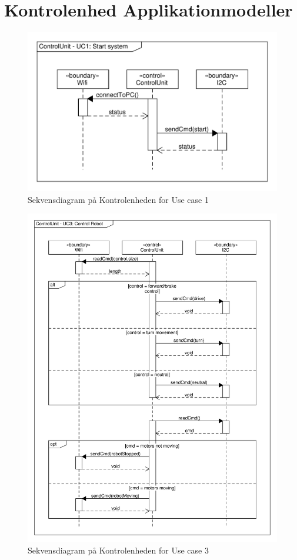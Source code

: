 \newpage
\section{Kontrolenhed Applikationmodeller}
\begin{figure} [H]
	\centering
	\includegraphics[clip, trim = 0cm 0cm 0cm 0.5cm ,width = \textwidth]{Figur/seq_Robot_UC1.pdf}
	\caption{Sekvensdiagram på Kontrolenheden for Use case 1}
	\label{fig:seq_Robot_UC1}
\end{figure}
\begin{figure} [H]
	\centering
	\includegraphics[clip, trim = 0cm 0cm 0cm 0.5cm ,width = \textwidth]{Figur/seq_Robot_UC3.pdf}
	\caption{Sekvensdiagram på Kontrolenheden for Use case 3}
	\label{fig:seq_Robot_UC3}
\end{figure}

